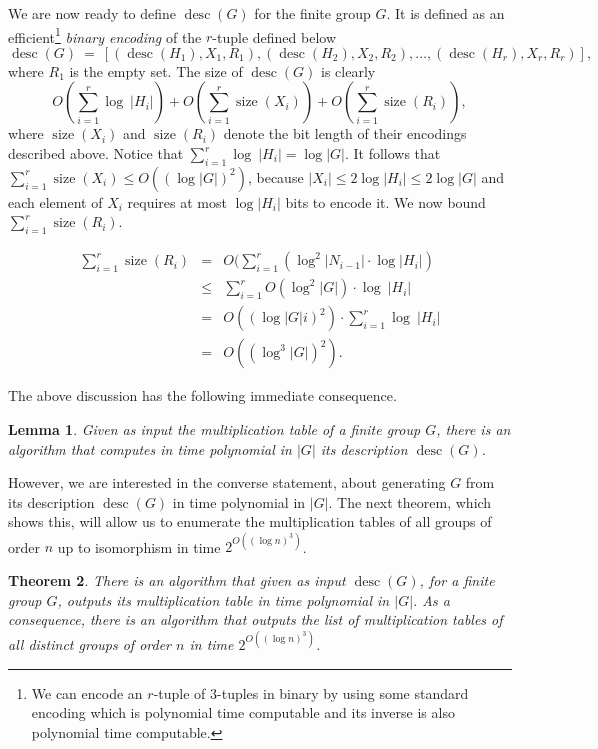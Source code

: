 \documentclass{elsarticle}
\newtheorem{theorem}{Theorem}[section]
\newtheorem{lemma}[theorem]{Lemma}
\newcommand{\desc}{\mathop{\mathrm{desc}}}
\newcommand{\size}{\mathop{\mathrm{size}}}
\begin{document}
We are now ready to define $\desc(G)$ for the finite group $G$. It is
defined as an efficient\footnote{We can encode an $r$-tuple of
  $3$-tuples in binary by using some standard encoding which is
  polynomial time computable and its inverse is also polynomial time
  computable.}
  \emph{binary encoding} of the $r$-tuple
defined below
\[
\desc(G) ~=~ [(\desc(H_1),X_1,R_1),(\desc(H_2),X_2,R_2),\ldots,(\desc(H_r),X_r,R_r)],
\]
where $R_1$ is the empty set. The size of $\desc(G)$ is clearly
\[
O(\sum_{i=1}^r \log~|H_i|) + O(\sum_{i=1}^r \size(X_i)) + O(\sum_{i=1}^r \size(R_i)),
\]
where $\size(X_i)$ and $\size(R_i)$ denote the bit length of their
encodings described above. Notice that
$\sum_{i=1}^r\log~|H_i| =\log |G|$. It follows that
$\sum_{i=1}^r\size(X_i)\le O((\log|G|)^2)$, because
$|X_i|\le 2\log |H_i|\le 2\log |G|$ and each element of $X_i$ requires
at most $\log |H_i|$ bits to encode it. We now bound
$\sum_{i=1}^r \size(R_i)$.

\begin{eqnarray*}
  \sum_{i=1}^r \size(R_i) &=& O(\sum_{i=1}^r (\log^2|N_{i-1}|\cdot\log |H_i|)\\
  &\le& \sum_{i=1}^rO( \log^2|G|)\cdot\log~|H_i|\\
  &=& O((\log|G|i)^2)\cdot \sum_{i=1}^r \log~|H_i|\\
  &=& O((\log^3|G|)^2).
\end{eqnarray*}

The above discussion has the following immediate consequence.

\begin{lemma}
  Given as input the multiplication table of a finite group $G$, there
  is an algorithm that computes in time polynomial in $|G|$ its
  description $\desc(G)$.
\end{lemma}

However, we are interested in the converse statement, about generating
$G$ from its description $\desc(G)$ in time polynomial in $|G|$.  The
next theorem, which shows this, will allow us to enumerate the
multiplication tables of all groups of order $n$ up to isomorphism in
time $2^{O((\log n)^3)}$.


\begin{theorem}\label{list-groups}
  There is an algorithm that given as input $\desc(G)$, for a finite
  group $G$, outputs its multiplication table in time polynomial in
  $|G|$. As a consequence, there is an algorithm that outputs the list
  of multiplication tables of all distinct groups of order $n$ in time
  $2^{O((\log n)^3)}$.
\end{theorem}
\end{document}
